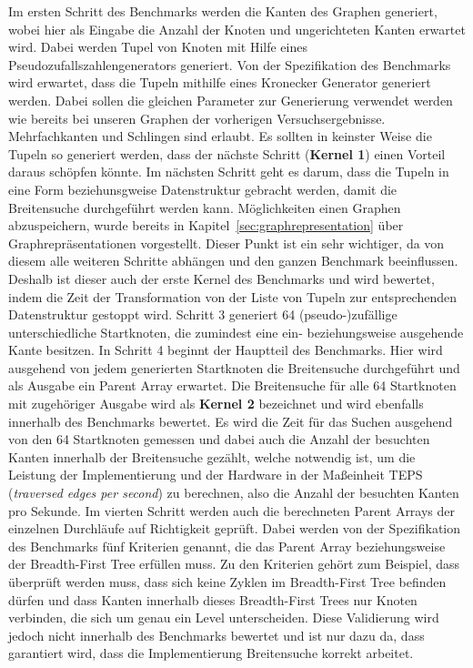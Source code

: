 \documentclass[11pt,a4paper]{article}
\begin{document}
Im ersten Schritt des Benchmarks werden die Kanten des Graphen generiert, wobei hier als Eingabe die Anzahl der Knoten und ungerichteten Kanten erwartet wird. Dabei werden Tupel von Knoten mit Hilfe eines Pseudozufallszahlengenerators generiert. Von der Spezifikation des Benchmarks wird erwartet, dass die Tupeln mithilfe eines Kronecker Generator generiert werden. Dabei sollen die gleichen Parameter zur Generierung verwendet werden wie bereits bei unseren Graphen der vorherigen Versuchsergebnisse. Mehrfachkanten und Schlingen sind erlaubt. Es sollten in keinster Weise die Tupeln so generiert werden, dass der nächste Schritt (\textbf{Kernel 1}) einen Vorteil daraus schöpfen könnte. Im nächsten Schritt geht es darum, dass die Tupeln in eine Form beziehunsgweise Datenstruktur gebracht werden, damit die Breitensuche durchgeführt werden kann. Möglichkeiten einen Graphen abzuspeichern, wurde bereits in Kapitel~\ref{sec:graphrepresentation} über Graphrepräsentationen vorgestellt. Dieser Punkt ist ein sehr wichtiger, da von diesem alle weiteren Schritte abhängen und den ganzen Benchmark beeinflussen. Deshalb ist dieser auch der erste Kernel des Benchmarks und wird bewertet, indem die Zeit der Transformation von der Liste von Tupeln zur entsprechenden Datenstruktur gestoppt wird.
Schritt 3 generiert 64 (pseudo-)zufällige unterschiedliche Startknoten, die zumindest eine ein- beziehungsweise ausgehende Kante besitzen. In Schritt 4 beginnt der Hauptteil des Benchmarks. Hier wird ausgehend von jedem generierten Startknoten die Breitensuche durchgeführt und als Ausgabe ein Parent Array erwartet. Die Breitensuche für alle 64 Startknoten mit zugehöriger Ausgabe wird als \textbf{Kernel 2} bezeichnet und wird ebenfalls innerhalb des Benchmarks bewertet. Es wird die Zeit für das Suchen ausgehend von den 64 Startknoten gemessen und dabei auch die Anzahl der besuchten Kanten innerhalb der Breitensuche gezählt, welche notwendig ist, um die Leistung der Implementierung und der Hardware in der Maßeinheit TEPS (\textit{traversed edges per second}) zu berechnen, also die Anzahl der besuchten Kanten pro Sekunde. Im vierten Schritt werden auch die berechneten Parent Arrays der einzelnen Durchläufe auf Richtigkeit geprüft. Dabei werden von der Spezifikation des Benchmarks fünf Kriterien genannt, die das Parent Array beziehungsweise der Breadth-First Tree erfüllen muss. Zu den Kriterien gehört zum Beispiel, dass überprüft werden muss, dass sich keine Zyklen im Breadth-First Tree befinden dürfen und dass Kanten innerhalb dieses Breadth-First Trees nur Knoten verbinden, die sich um genau ein Level unterscheiden. Diese Validierung wird jedoch nicht innerhalb des Benchmarks bewertet und ist nur dazu da, dass garantiert wird, dass die Implementierung Breitensuche korrekt arbeitet.\\
\end{document}
